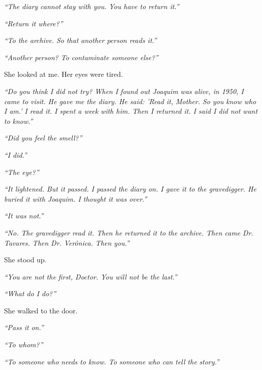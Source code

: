 \noindent \textit{\textquotedblleft{}The diary cannot stay with you. You have to return it.\textquotedblright{}}

\noindent \textit{\textquotedblleft{}Return it where?\textquotedblright{}}

\noindent \textit{\textquotedblleft{}To the archive. So that another person reads it.\textquotedblright{}}

\noindent \textit{\textquotedblleft{}Another person? To contaminate someone else?\textquotedblright{}}

\noindent She looked at me. Her eyes were tired.

\noindent \textit{\textquotedblleft{}Do you think I did not try? When I found out Joaquim was alive, in 1950, I came to visit. He gave me the diary. He said: 'Read it, Mother. So you know who I am.' I read it. I spent a week with him. Then I returned it. I said I did not want to know.\textquotedblright{}}

\noindent \textit{\textquotedblleft{}Did you feel the smell?\textquotedblright{}}

\noindent \textit{\textquotedblleft{}I did.\textquotedblright{}}

\noindent \textit{\textquotedblleft{}The eye?\textquotedblright{}}

\noindent \textit{\textquotedblleft{}It lightened. But it passed. I passed the diary on. I gave it to the gravedigger. He buried it with Joaquim. I thought it was over.\textquotedblright{}}

\noindent \textit{\textquotedblleft{}It was not.\textquotedblright{}}

\noindent \textit{\textquotedblleft{}No. The gravedigger read it. Then he returned it to the archive. Then came Dr. Tavares. Then Dr. Verônica. Then you.\textquotedblright{}}

\noindent She stood up.

\noindent \textit{\textquotedblleft{}You are not the first, Doctor. You will not be the last.\textquotedblright{}}

\noindent \textit{\textquotedblleft{}What do I do?\textquotedblright{}}

\noindent She walked to the door.

\noindent \textit{\textquotedblleft{}Pass it on.\textquotedblright{}}

\noindent \textit{\textquotedblleft{}To whom?\textquotedblright{}}

\noindent \textit{\textquotedblleft{}To someone who needs to know. To someone who can tell the story.\textquotedblright{}}

